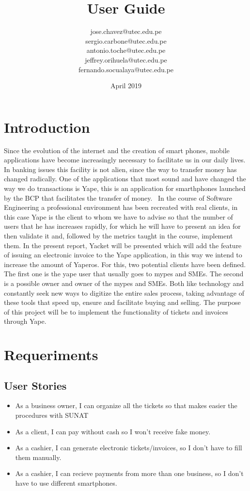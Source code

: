 \documentclass{article}
\title{User Guide}
\author{jose.chavez@utec.edu.pe \\ sergio.carbone@utec.edu.pe\\antonio.toche@utec.edu.pe\\jeffrey.orihuela@utec.edu.pe\\fernando.socualaya@utec.edu.pe}
\date{April 2019}
\begin{document}
\maketitle

\section{Introduction}
Since the evolution of the internet and the creation of smart phones, mobile applications have become increasingly necessary to facilitate us in our daily lives. In banking issues this facility is not alien, since the way to transfer money has changed radically. One of the applications that most sound and have changed the way we do transactions is Yape, this is an application for smarthphones launched by the BCP that facilitates the transfer of money.
 In the course of Software Engineering a professional environment has been recreated with real clients, in this case Yape is the client to whom we have to advise so that the number of users that he has increases rapidly, for which he will have to present an idea for then validate it and, followed by the metrics taught in the course, implement them. In the present report, Yacket will be presented which will add the feature of issuing an electronic invoice to the Yape application, in this way we intend to increase the amount of Yaperos.
For this, two potential clients have been defined. The first one is the yape user that usually goes to mypes and SMEs. The second is a possible owner and owner of the mypes and SMEs. Both like technology and constantly seek new ways to digitize the entire sales process, taking advantage of these tools that speed up, ensure and facilitate buying and selling.
The purpose of this project will be to implement the functionality of tickets and invoices through Yape.


\section{Requeriments}
    \subsection{User Stories} 
    \begin{itemize}
    \item As a business owner, I can organize all the tickets so that makes easier the procedures with SUNAT
    \item As a client, I can pay without cash so I won't receive fake money.
    \item As a cashier, I can generate electronic tickets/invoices, so I don't have to fill them manually.
    \item As a cashier, I can recieve payments from more than one business, so I don't have to use different smartphones. 
    \end{itemize}
    
\end{document}
